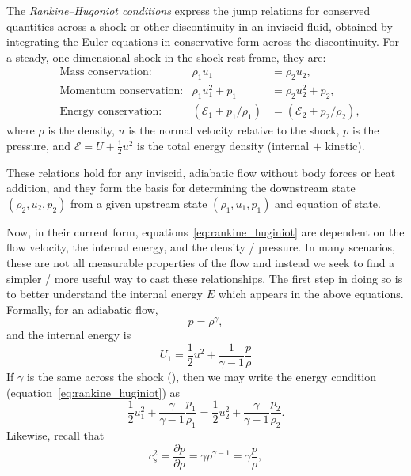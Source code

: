 \begin{definition}
The \emph{Rankine--Hugoniot conditions} express the jump relations for conserved quantities across a shock or other discontinuity in an inviscid fluid, obtained by integrating the Euler equations in conservative form across the discontinuity.  
For a steady, one-dimensional shock in the shock rest frame, they are:
\begin{equation}
\label{eq:rankine_huginiot}
    \begin{aligned}
&\text{Mass conservation:} & \rho_1 u_1 &= \rho_2 u_2, \\
&\text{Momentum conservation:} & \rho_1 u_1^2 + p_1 &= \rho_2 u_2^2 + p_2, \\
&\text{Energy conservation:} & \left(\mathcal{E}_1 + p_1/\rho_1\right) &= \left(\mathcal{E}_2 + p_2/\rho_2\right),
\end{aligned}
\end{equation}
where $\rho$ is the density, $u$ is the normal velocity relative to the shock, $p$ is the pressure, and $\mathcal{E} = U + \tfrac{1}{2} u^2$ is the total energy density (internal $+$ kinetic).  

These relations hold for any inviscid, adiabatic flow without body forces or heat addition, and they form the basis for determining the downstream state $(\rho_2,u_2,p_2)$ from a given upstream state $(\rho_1,u_1,p_1)$ and equation of state.
\end{definition}
\vspace{0.5cm}
Now, in their current form, equations~\ref{eq:rankine_huginiot} are dependent on the flow velocity, the internal energy, and the density / pressure. In many scenarios, these are not all measurable properties of the flow and instead we seek to find a simpler / more useful way to cast these relationships. The first step in doing so is to better understand the internal energy $E$ which appears in the above equations. Formally, for an adiabatic flow,
\[
p = \rho^\gamma,
\]
and the internal energy is
\[
U_1 = \frac{1}{2}u^2 + \frac{1}{\gamma -1} \frac{p}{\rho}
\]
If $\gamma$ is the same across the shock (), then we may write the energy condition (equation~\ref{eq:rankine_huginiot}) as
\[
\frac{1}{2}u_1^2 + \frac{\gamma}{\gamma -1} \frac{p_1}{\rho_1} = \frac{1}{2}u_2^2 + \frac{\gamma}{\gamma -1} \frac{p_2}{\rho_2}.
\]
Likewise, recall that
\[
c_s^2 = \frac{\partial p}{\partial \rho} = \gamma \rho^{\gamma -1 } = \gamma \frac{p}{\rho},
\]
